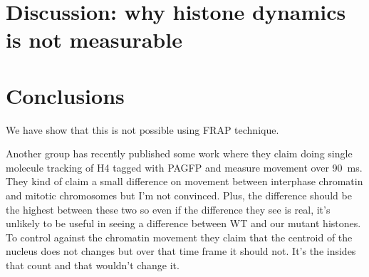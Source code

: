 

\section{Discussion: why histone dynamics is not measurable}


\section{Conclusions}
  We have show that this is not possible using FRAP technique.

  
  Another group has recently
  published some work where they claim doing single molecule tracking of H4 tagged with PAGFP
  and measure movement over \SI{90}{\ms}. They kind of claim
  a small difference on movement between interphase chromatin and mitotic chromosomes but
  I'm not convinced. Plus, the difference should be the highest between these two so even if
  the difference they see is real, it's unlikely to be useful in seeing a difference between
  WT and our mutant histones. To control against the chromatin movement they claim that the
  centroid of the nucleus does not changes but over that time frame it should not. It's the
  insides that count and that wouldn't change it.
  


